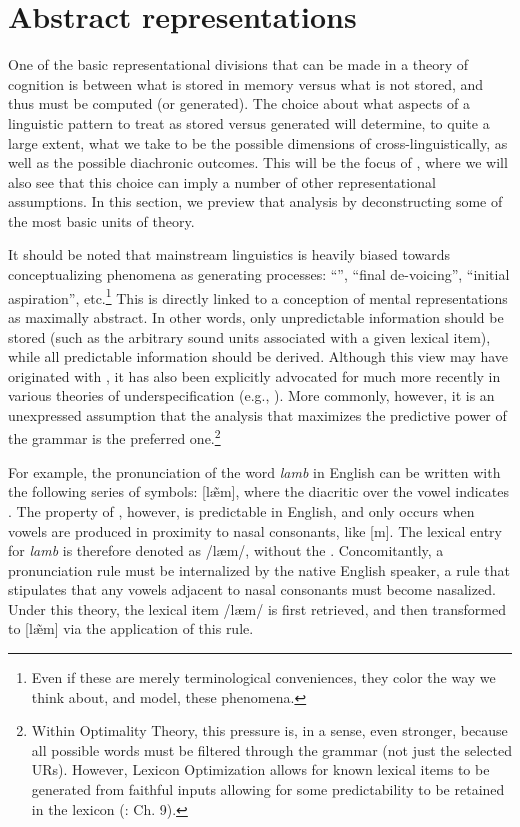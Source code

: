 \section{Abstract representations}\largerpage

One of the basic representational divisions that can be made in a
theory of cognition is between what is stored in memory versus what
is not stored, and thus must be computed (or generated). The choice
about what aspects of a linguistic pattern to treat as stored versus
generated will determine, to quite a large extent, what we take to
be the possible dimensions of  cross-linguistically,
as well as the possible diachronic outcomes. This will be the focus
of , where we will also see that
this choice can imply a number of other representational assumptions.
In this section, we preview that analysis by deconstructing some of
the most basic units of  theory.

It should be noted that mainstream  linguistics is heavily
biased towards conceptualizing phenomena as generating processes:
“”, “final de-voicing”, “initial
aspiration”, etc.\footnote{Even if these are merely terminological conveniences, they color the
way we think about, and model, these phenomena.} This is directly linked to a conception of mental representations
as maximally abstract. In other words, only unpredictable information
should be stored (such as the arbitrary sound units associated with
a given lexical item), while all predictable information should be
derived. Although this view may have originated with \citet{Chomsky1968},
it has also been explicitly advocated for much more recently in various
theories of underspecification (e.g., \citealt{archangeli1988aspects,Steriade1995a}).
More commonly, however, it is an unexpressed assumption that the analysis
that maximizes the predictive power of the grammar is the preferred
one.\footnote{Within Optimality Theory, this pressure is, in a sense, even stronger,
because all possible words must be filtered through the grammar (not
just the selected URs). However, Lexicon Optimization allows for known
lexical items to be generated from faithful inputs allowing for some
predictability to be retained in the lexicon (\citealt{Prince2004}:
Ch. 9). }

For example, the pronunciation of the word \textit{lamb} in English
can be written with the following series of  symbols: {[læ̃m]},
where the diacritic over the vowel indicates . The property
of , however, is predictable in English, and only occurs
when vowels are produced in proximity to nasal consonants, like {[}m{]}.
The lexical entry for \textit{lamb} is therefore denoted as {/læm/},
without the . Concomitantly, a pronunciation rule must
be internalized by the native English speaker, a rule that stipulates
that any vowels adjacent to nasal consonants must become nasalized.
Under this theory, the lexical item {/læm/} is first retrieved,
and then transformed to {[læ̃m]} via the application of
this rule. 

